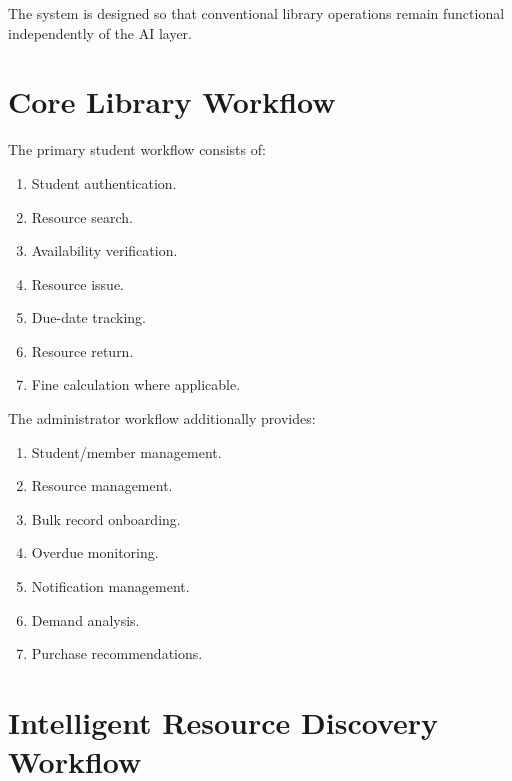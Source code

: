 \documentclass{tietreport}
\begin{document}
The system is designed so that conventional library operations remain
functional independently of the AI layer.

\section{Core Library Workflow}

The primary student workflow consists of:

\begin{enumerate}

    \item Student authentication.

    \item Resource search.

    \item Availability verification.

    \item Resource issue.

    \item Due-date tracking.

    \item Resource return.

    \item Fine calculation where applicable.

\end{enumerate}

The administrator workflow additionally provides:

\begin{enumerate}

    \item Student/member management.

    \item Resource management.

    \item Bulk record onboarding.

    \item Overdue monitoring.

    \item Notification management.

    \item Demand analysis.

    \item Purchase recommendations.

\end{enumerate}

\section{Intelligent Resource Discovery Workflow}
\end{document}

